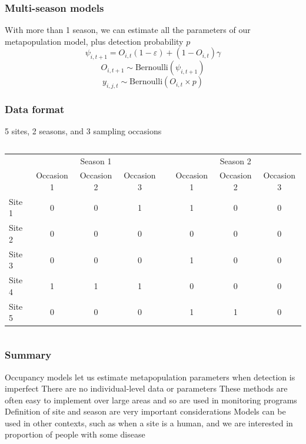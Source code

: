\documentclass[color=usenames,dvipsnames]{beamer}\usepackage[]{graphicx}\usepackage[]{color}
\begin{document}
\begin{frame}
  \frametitle{Multi-season models}
  \large
  With more than 1 season, we can estimate all the parameters of our
  metapopulation model, plus detection probability $p$
  \pause
  \[
    \psi_{i,t+1} = O_{i,t}(1-\varepsilon) + (1-O_{i,t})\gamma
  \]
  \[
    O_{i,t+1} \sim \mbox{Bernoulli}(\psi_{i,t+1})
  \]
  \[
    y_{i,j,t} \sim \mathrm{Bernoulli}(O_{i,t} \times p)
  \]
\end{frame}




\begin{frame}
  \frametitle{Data format}
  {%
    \centering \large 5 sites, 2 seasons, and 3 sampling occasions \par}
  \vspace{0.3cm}
  \begin{columns}
    \column{\dimexpr\paperwidth-10pt}
    \scriptsize
      \begin{tabular}{lccccccc}
        \hline
        & \multicolumn{3}{c}{Season 1} & &
        \multicolumn{3}{c}{Season 2} \\
        \cline{2-4} \cline{6-8}
        & Occasion 1 & Occasion 2 & Occasion 3 & & Occasion 1 & Occasion 2 & Occasion 3 \\
        \hline
        Site 1 & 0 & 0 & 1 & & 1 & 0 & 0 \\
        Site 2 & 0 & 0 & 0 & & 0 & 0 & 0 \\
        Site 3 & 0 & 0 & 0 & & 1 & 0 & 0 \\
        Site 4 & 1 & 1 & 1 & & 0 & 0 & 0 \\
        Site 5 & 0 & 0 & 0 & & 1 & 1 & 0 \\
        \hline
      \end{tabular}
  \end{columns}
\end{frame}




\begin{frame}
  \frametitle{Summary}
  \large
  Occupancy models let us estimate metapopulation parameters
      when detection is imperfect
\pause
\vfill
      There are no individual-level data or parameters
\pause
\vfill
      These methods are often easy to implement over large areas
      and so are used in monitoring programs
\pause
\vfill
      Definition of site and season are very important considerations
\pause
\vfill
      Models can be used in other contexts, such as when a site is
      a human, and we are interested in proportion of people with some disease
\end{frame}
\end{document}
